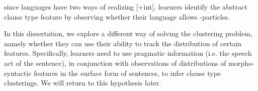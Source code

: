 since languages have two ways of realizing [+int], learners identify the abstract clause type feature by observing whether their language allows \twh-particles. 


In this dissertation, we explore a different way of solving the clustering problem, namely whether they can use their ability to track the distribution of certain features. Specifically, learners need to use pragmatic information (i.e. the speech act of the sentence), in conjunction with observations of distributions of morpho-syntactic features in the surface form of sentences, to infer clause type clusterings. We will return to this hypothesis later. 




 

%

